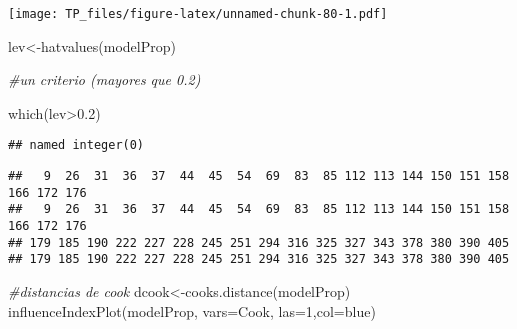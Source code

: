 \documentclass[
]{article}
\newenvironment{Shaded}{\begin{snugshade}}{\end{snugshade}}
\newcommand{\AttributeTok}[1]{\textcolor[rgb]{0.77,0.63,0.00}{#1}}
\newcommand{\CommentTok}[1]{\textcolor[rgb]{0.56,0.35,0.01}{\textit{#1}}}
\newcommand{\DecValTok}[1]{\textcolor[rgb]{0.00,0.00,0.81}{#1}}
\newcommand{\FloatTok}[1]{\textcolor[rgb]{0.00,0.00,0.81}{#1}}
\newcommand{\FunctionTok}[1]{\textcolor[rgb]{0.00,0.00,0.00}{#1}}
\newcommand{\NormalTok}[1]{#1}
\newcommand{\OtherTok}[1]{\textcolor[rgb]{0.56,0.35,0.01}{#1}}
\newcommand{\SpecialCharTok}[1]{\textcolor[rgb]{0.00,0.00,0.00}{#1}}
\newcommand{\StringTok}[1]{\textcolor[rgb]{0.31,0.60,0.02}{#1}}
\begin{document}
\texttt{[image: TP\_files/figure-latex/unnamed-chunk-80-1.pdf]}

\begin{Shaded}
\begin{Highlighting}[]
\NormalTok{lev}\OtherTok{\textless{}{-}}\FunctionTok{hatvalues}\NormalTok{(modelProp)}

\CommentTok{\#un criterio (mayores que 0.2) }

\FunctionTok{which}\NormalTok{(lev}\SpecialCharTok{\textgreater{}}\FloatTok{0.2}\NormalTok{)}
\end{Highlighting}
\end{Shaded}

\begin{verbatim}
## named integer(0)
\end{verbatim}

\begin{Shaded}
\end{Shaded}

\begin{verbatim}
##   9  26  31  36  37  44  45  54  69  83  85 112 113 144 150 151 158 166 172 176 
##   9  26  31  36  37  44  45  54  69  83  85 112 113 144 150 151 158 166 172 176 
## 179 185 190 222 227 228 245 251 294 316 325 327 343 378 380 390 405 
## 179 185 190 222 227 228 245 251 294 316 325 327 343 378 380 390 405
\end{verbatim}

\begin{Shaded}
\begin{Highlighting}[]
\CommentTok{\#distancias de cook}
\NormalTok{dcook}\OtherTok{\textless{}{-}}\FunctionTok{cooks.distance}\NormalTok{(modelProp)}
\FunctionTok{influenceIndexPlot}\NormalTok{(modelProp, }\AttributeTok{vars=}\StringTok{\textquotesingle{}Cook\textquotesingle{}}\NormalTok{, }\AttributeTok{las=}\DecValTok{1}\NormalTok{,}\AttributeTok{col=}\StringTok{\textquotesingle{}blue\textquotesingle{}}\NormalTok{)}
\end{Highlighting}
\end{Shaded}
\end{document}
